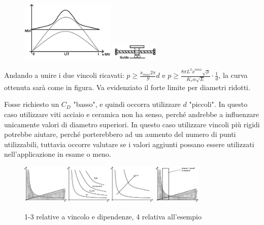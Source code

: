 \begin{figure}[h]
    \centering
    \includegraphics[width=0.4\textwidth]{Immagini/vel_critica_vite_2sol.png}
    \includegraphics[width=0.2\textwidth]{Immagini/vite_guida_MV.png}
\end{figure}

Andando a unire i due vincoli ricavati: \(p \geqslant \frac{\dot{x}_{max} 2\pi }{S} d\) e \( p \geqslant \frac{8\pi L^2 \dot{x}^{max} \sqrt{\rho}}{K_v \alpha \sqrt{E}} \cdot \frac{1}{d} \), la curva ottenuta sarà come in figura. Va evidenziato il forte limite per diametri ridotti.

Fosse richiesto un \( C_D \) "basso", e quindi occorra utilizzare \(d\) "piccoli". In questo caso utilizzare viti acciaio e ceramica non ha senso, perché andrebbe a influenzare unicamente valori di diametro superiori. In questo caso utilizzare vincoli più rigidi potrebbe aiutare, perché porterebbero ad un aumento del numero di punti utilizzabili, tuttavia occorre valutare se i valori aggiunti possano essere utilizzati nell'applicazione in esame o meno.

\begin{figure}[h]
    \centering
    \includegraphics[width=0.6\textwidth]{Immagini/viti_ricir_vincoli_p_d.png}
    \includegraphics[width=0.2\textwidth]{Immagini/viti_ricir_esempio_vincoli.png}
    \caption{1-3 relative a vincolo e dipendenze, 4 relativa all'esempio}
\end{figure}

